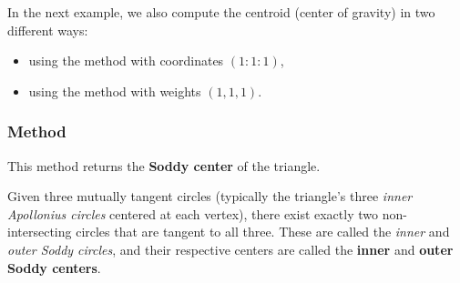 \medskip
\noindent
In the next example, we also compute the centroid (center of gravity) in two different ways:
\begin{itemize}
  \item using the  method with coordinates $(1:1:1)$,
  \item using the  method with weights $(1,1,1)$.
\end{itemize}

\vspace{1em}

\begin{minipage}{.5\textwidth}
\begin{center}
\end{center}
\end{minipage}
\begin{minipage}{.5\textwidth}
\begin{tkzexample}
\end{tkzexample}
\end{minipage}

\subsubsection{Method }
\label{ssub:method_triangle_soddy_center}

This method returns the \textbf{Soddy center} of the triangle.

\medskip
\noindent
Given three mutually tangent circles (typically the triangle’s three \emph{inner Apollonius circles} centered at each vertex), there exist exactly two non-intersecting circles that are tangent to all three. These are called the \emph{inner} and \emph{outer Soddy circles}, and their respective centers are called the \textbf{inner} and \textbf{outer Soddy centers}.

